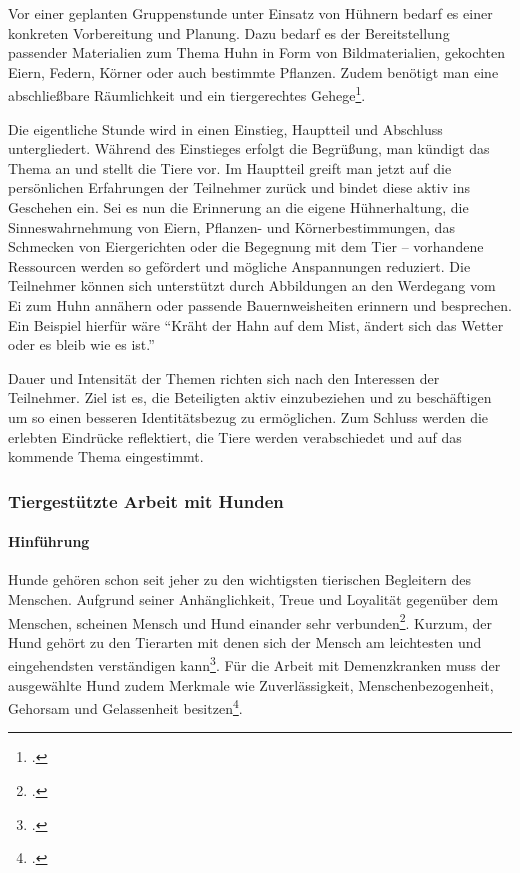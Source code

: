 Vor einer geplanten Gruppenstunde unter Einsatz von Hühnern bedarf es einer konkreten Vorbereitung und Planung. Dazu bedarf es der Bereitstellung passender Materialien zum Thema Huhn in Form von Bildmaterialien, gekochten Eiern, Federn, Körner oder auch bestimmte Pflanzen. Zudem benötigt man eine abschließbare Räumlichkeit und ein tiergerechtes Gehege\footcite[vgl.][61-67]{Giruc2011}. 

Die eigentliche Stunde wird in einen Einstieg, Hauptteil und Abschluss untergliedert. Während des Einstieges erfolgt die Begrüßung, man kündigt das Thema an und stellt die Tiere vor. Im Hauptteil greift man jetzt auf die persönlichen Erfahrungen der Teilnehmer zurück und bindet diese aktiv ins Geschehen ein. Sei es nun die Erinnerung an die eigene Hühnerhaltung, die Sinneswahrnehmung von Eiern, Pflanzen- und Körnerbestimmungen, das Schmecken von Eiergerichten oder die Begegnung mit dem Tier -- vorhandene Ressourcen werden so gefördert und mögliche Anspannungen reduziert. Die Teilnehmer können sich unterstützt durch Abbildungen an den Werdegang vom Ei zum Huhn annähern oder passende Bauernweisheiten erinnern und besprechen. Ein Beispiel hierfür wäre "`Kräht der Hahn auf dem Mist, ändert sich das Wetter oder es bleib wie es ist."' 

Dauer und Intensität der Themen richten sich nach den Interessen der Teilnehmer. Ziel ist es, die Beteiligten aktiv einzubeziehen und zu beschäftigen um so einen besseren Identitätsbezug zu ermöglichen. Zum Schluss werden die erlebten Eindrücke reflektiert, die Tiere werden verabschiedet und auf das kommende Thema eingestimmt.
\newpage

\subsubsection{Tiergestützte Arbeit mit Hunden}
\label{sec:k4.3.2_TiergestützteArbeitMitHunden}

\paragraph{Hinführung}
\label{sec:k4.3.2.1_Hinfuehrung}

Hunde gehören schon seit jeher zu den wichtigsten tierischen Begleitern des Menschen. Aufgrund seiner Anhänglichkeit, Treue und Loyalität gegenüber dem Menschen, scheinen Mensch und Hund einander sehr verbunden\footcite[vgl.][92]{Ochsenbein2005}. Kurzum, der Hund gehört zu den Tierarten mit denen sich der Mensch am leichtesten und eingehendsten verständigen kann\footcite[vgl.][95]{Ochsenbein2005}. Für die Arbeit mit Demenzkranken muss der ausgewählte Hund zudem Merkmale wie Zuverlässigkeit, Menschenbezogenheit, Gehorsam und Gelassenheit besitzen\footcite[vgl.][42]{Giruc2011}.

